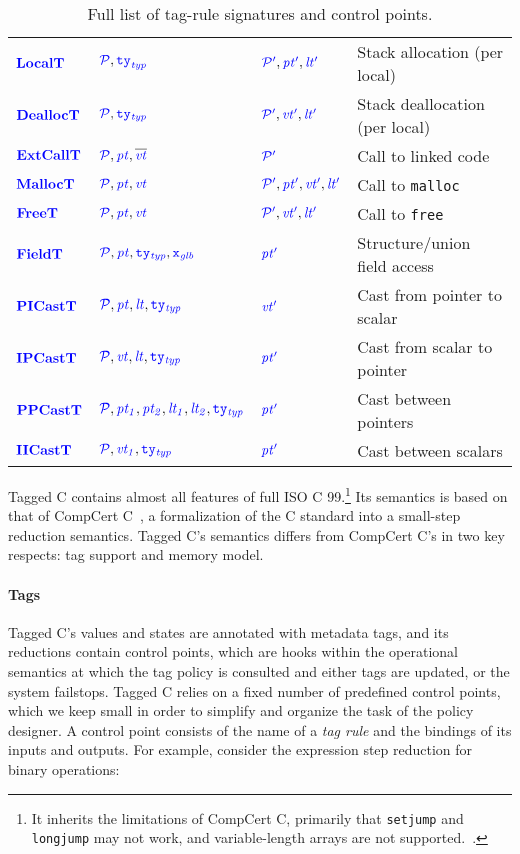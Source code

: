 \documentclass{llncs}
\begin{document}
\begin{table}[t]
\begin{center}
\begin{tabular}{|l|l|l|l|}
    \(\localtname\)     & \(\localtargs\)        & \(\localtres\)     & Stack allocation (per local) \\
    \(\dealloctname\)   & \(\dealloctargs\)      & \(\dealloctres\)   & Stack deallocation (per local) \\
    \(\extcalltname\)   & \(\extcalltargs\)      & \(\extcalltres\)   & Call to linked code \\
    \(\malloctname\)    & \(\malloctargs\)       & \(\malloctres\)    & Call to {\tt malloc} \\
    \(\freetname\)      & \(\freetargs\)         & \(\freetres\)      & Call to {\tt free} \\
    \(\fieldtname\)     & \(\fieldtargs\)        & \(\fieldtres\)     & Structure/union field access \\
    \(\picasttname\)    & \(\picasttargs\)       & \(\picasttres\)    & Cast from pointer to scalar \\
    \(\ipcasttname\)    & \(\ipcasttargs\)       & \(\ipcasttres\)    & Cast from scalar to pointer \\
    \(\ppcasttname\)    & \(\ppcasttargs\)       & \(\ppcasttres\)    & Cast between pointers \\
    \(\iicasttname\)    & \(\iicasttargs\)       & \(\iicasttres\)    & Cast between scalars \\
    \hline
  \end{tabular}
\end{center}

  \caption{Full list of tag-rule signatures and control points. %
}
  \label{fig:controlpoints}
\end{table}

Tagged C contains almost all features of full ISO C 99.\footnote{
It inherits the limitations of CompCert C, primarily that {\tt setjump} and {\tt longjump}
may not work, and variable-length arrays are not supported.~\cite[Ch. 5]{Leroy23:CompCertManual}.}
Its semantics is based on that of CompCert C~\cite{Leroy09:CompCert},
a formalization of the C standard into a small-step reduction semantics.
Tagged C's semantics differs from CompCert C's in two key respects: tag support and memory model.

\paragraph{Tags}
Tagged C's values
and states are annotated with metadata tags, and its reductions contain
control points, which are hooks within the
operational semantics at which the tag policy is consulted and either tags are updated, or the system
failstops.
Tagged C relies on a fixed number of predefined control points, which we keep small
in order to simplify and organize the task of the policy designer.
A control point consists of the name of a {\em tag rule}
and the bindings of its inputs and outputs. For example, consider the expression step reduction
for binary operations:
\end{document}
